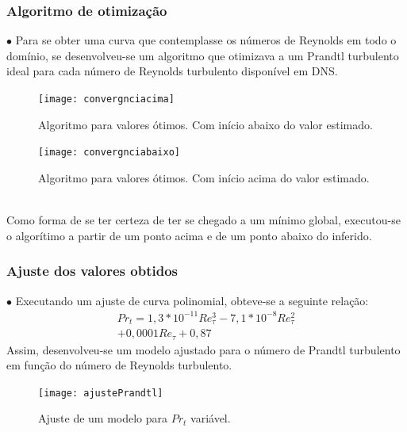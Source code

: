 \documentclass[xcolor=dvipsnames,10pt,aspectratio=169]{beamer}
\begin{document}
	
	
	
		
		\begin{frame}
		\frametitle{Algoritmo de otimização}
		$\bullet$ Para se obter uma curva que contemplasse os números de Reynolds em todo o domínio, se desenvolveu-se um algoritmo que otimizava a um Prandtl turbulento ideal para cada número de Reynolds turbulento disponível em DNS.\\
		\begin{minipage}[h!]{0.45\textwidth}
			\begin{figure}
				\centering
				\texttt{[image: convergnciacima]}
				\caption{Algoritmo para valores ótimos. Com início abaixo do valor estimado.}
			\end{figure}
		\end{minipage}\hfill
		\begin{minipage}[h!]{0.45\textwidth}
			\begin{figure}
				\centering
				\texttt{[image: convergnciabaixo]}
				\caption{Algoritmo para valores ótimos. Com início acima do valor estimado.}
			\end{figure}
		\end{minipage}\\
		Como forma de se ter certeza de ter se chegado a um mínimo global, executou-se o algorítimo a partir de um ponto acima e de um ponto abaixo do inferido. 		
		\end{frame}	
	
	
	
	
		\begin{frame}
		\frametitle{Ajuste dos valores obtidos}
		\begin{minipage}[h!]{0.45\textwidth}
			$\bullet$ Executando um ajuste de curva polinomial, obteve-se a seguinte relação:
			\begin{equation}
			\begin{split}
			Pr_t = 1,3 * 10^{-11} Re_\tau^3 - 7,1 * 10^{-8} Re_\tau^2 \\ + 0,0001 Re_\tau + 0,87 
			\end{split}
			\end{equation}
			Assim, desenvolveu-se um modelo ajustado para o número de Prandtl turbulento em função do número de Reynolds turbulento.
		\end{minipage}\hfill
		\begin{minipage}[h!]{0.45\textwidth}
			\begin{figure}
				\centering
				\texttt{[image: ajustePrandtl]}
				\caption{Ajuste de um modelo para $Pr_t$ variável.}
			\end{figure}
		\end{minipage}\\
		\end{frame}	
		
\end{document}
